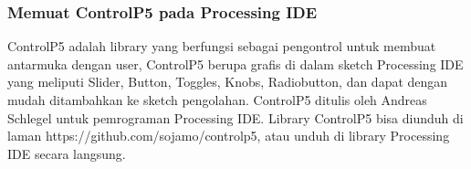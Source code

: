 \subsubsection{ Memuat ControlP5 pada Processing IDE }
ControlP5 adalah library yang berfungsi sebagai pengontrol untuk membuat antarmuka dengan user, ControlP5 berupa grafis di dalam sketch Processing IDE yang meliputi Slider, Button, Toggles, Knobs, Radiobutton, dan dapat dengan mudah ditambahkan ke sketch pengolahan. ControlP5 ditulis oleh Andreas Schlegel untuk pemrograman Processing IDE. Library ControlP5 bisa diunduh di laman https://github.com/sojamo/controlp5, atau unduh di library Processing IDE secara langsung. 

